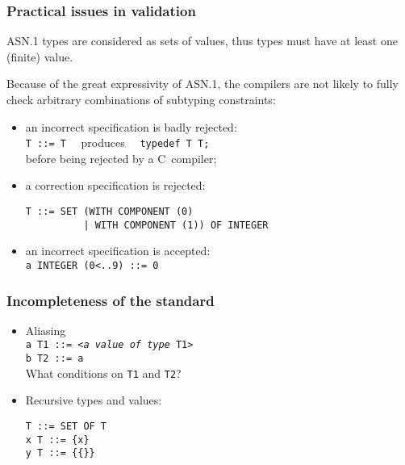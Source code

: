 \documentclass[compress,dvips,xcolor={dvipsnames},t]{beamer}
\newcommand\ASN{\textsf{ASN.1}\xspace}
\begin{document}
\begin{frame}[containsverbatim]
\frametitle{Practical issues in validation}

\ASN types are considered as sets of values, thus types must have at
least one (finite) value.

\bigskip

Because of the great expressivity of \ASN, the compilers are not
likely to fully check arbitrary combinations of subtyping
constraints:
\begin{itemize}

   \item an incorrect specification is badly rejected: \\
         \verb+T ::= T+ \ \ produces \ \ \verb+typedef T T;+ \\ 
         before being rejected by a C~compiler;

   \item a correction specification is rejected:
\begin{verbatim}
T ::= SET (WITH COMPONENT (0)
          | WITH COMPONENT (1)) OF INTEGER
\end{verbatim}

           \item an incorrect specification is accepted:\\
                 \verb+a INTEGER (0<..9) ::= 0+
\end{itemize}

\end{frame}

\begin{frame}[containsverbatim]
\frametitle{Incompleteness of the standard}

\begin{itemize}

  \item Aliasing\\
        \texttt{a T1 ::= <\emph{a value of type} T1>}\\
        \texttt{b T2 ::= a} \\
        What conditions on \texttt{T1} and \texttt{T2}?

  \item Recursive types and values:
\begin{verbatim}
T ::= SET OF T
x T ::= {x}
y T ::= {{}}
\end{verbatim}

\end{itemize}

\end{frame}
\end{document}
